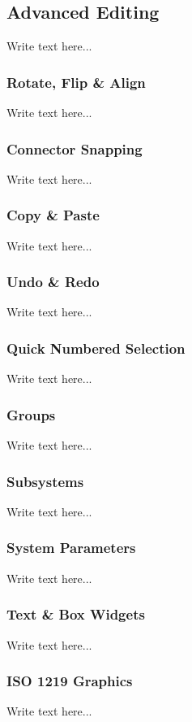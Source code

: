 
\subsection{Advanced Editing}
Write text here...

\subsubsection{Rotate, Flip \& Align}
Write text here...

\subsubsection{Connector Snapping}
Write text here...

\subsubsection{Copy \& Paste}
Write text here...

\subsubsection{Undo \& Redo}
Write text here...

\subsubsection{Quick Numbered Selection}
Write text here...

\subsubsection{Groups}
Write text here...

\subsubsection{Subsystems}
Write text here...

\subsubsection{System Parameters}
Write text here...

\subsubsection{Text \& Box Widgets}
Write text here...

\subsubsection{ISO 1219 Graphics}
Write text here...

